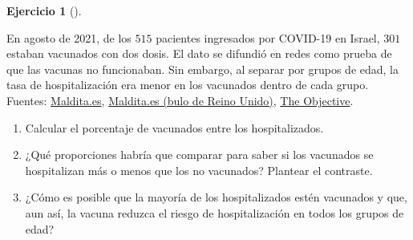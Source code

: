 \documentclass[
  spanish,
  a4paper,
]{scrreport}
\theoremstyle{definition}
\newtheorem{exercise}{Ejercicio}[chapter]
\theoremstyle{remark}
\begin{document}
\begin{exercise}[]\protect\hypertarget{exr-interpretacion-paradoja-simpson}{}\label{exr-interpretacion-paradoja-simpson}

En agosto de 2021, de los \(515\) pacientes ingresados por COVID-19 en
Israel, \(301\) estaban vacunados con dos dosis. El dato se difundió en
redes como prueba de que las vacunas no funcionaban. Sin embargo, al
separar por grupos de edad, la tasa de hospitalización era menor en los
vacunados dentro de cada grupo. Fuentes:
\href{https://maldita.es/malditateexplica/20210908/paradoja-simpson-malinterpretar-datos-vacunas-covid/}{Maldita.es},
\href{https://maldita.es/malditaciencia/20211008/muertes-covid-19-reino-unido-vacunados}{Maldita.es
(bulo de Reino Unido)},
\href{https://theobjective.com/sociedad/ciencia/2021-12-05/efectividad-vacunal-hospitalizados-paradoja-simpson/}{The
Objective}.

\begin{enumerate}
\def\labelenumi{\alph{enumi}.}
\item
  Calcular el porcentaje de vacunados entre los hospitalizados.
\item
  ¿Qué proporciones habría que comparar para saber si los vacunados se
  hospitalizan más o menos que los no vacunados? Plantear el contraste.
\item
  ¿Cómo es posible que la mayoría de los hospitalizados estén vacunados
  y que, aun así, la vacuna reduzca el riesgo de hospitalización en
  todos los grupos de edad?
\end{enumerate}

\end{exercise}
\end{document}
